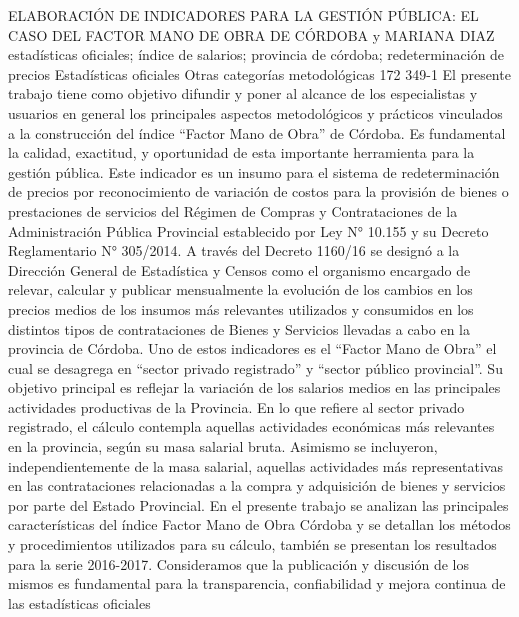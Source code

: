 \A
{ELABORACIÓN DE INDICADORES PARA LA GESTIÓN PÚBLICA: EL CASO DEL FACTOR MANO DE OBRA DE CÓRDOBA}
{ y MARIANA DIAZ}
{
\\}
{estadísticas oficiales; índice de salarios; provincia de córdoba; redeterminación de precios} 
 {Estadísticas oficiales} 
 {Otras categorías metodológicas} 
 {172} 
 {349-1}
{El presente trabajo tiene como objetivo difundir y poner al alcance de los especialistas y usuarios en general los principales aspectos metodológicos y prácticos vinculados a la construcción del índice “Factor Mano de Obra” de Córdoba. Es fundamental la calidad, exactitud, y oportunidad de esta importante herramienta para la gestión pública. Este indicador es un insumo para el sistema de redeterminación de precios por reconocimiento de variación de costos para la provisión de bienes o prestaciones de servicios del Régimen de Compras y Contrataciones de la Administración Pública Provincial establecido por Ley N° 10.155 y su Decreto Reglamentario N° 305/2014. A través del Decreto 1160/16 se designó a la Dirección General de Estadística y Censos como el organismo encargado de relevar, calcular y publicar mensualmente la evolución de los cambios en los precios medios de los insumos más relevantes utilizados y consumidos en los distintos tipos de contrataciones de Bienes y Servicios llevadas a cabo en la provincia de Córdoba. Uno de estos indicadores es el “Factor Mano de Obra” el cual se desagrega en “sector privado registrado” y “sector público provincial”. Su objetivo principal es reflejar la variación de los salarios medios en las principales actividades productivas de la Provincia. En lo que refiere al sector privado registrado, el cálculo contempla aquellas actividades económicas más relevantes en la provincia, según su masa salarial bruta. Asimismo se incluyeron, independientemente de la masa salarial, aquellas actividades más representativas en las contrataciones relacionadas a la compra y adquisición de bienes y servicios por parte del Estado Provincial. En el presente trabajo se analizan las principales características del índice Factor Mano de Obra Córdoba y se detallan los métodos y procedimientos utilizados para su cálculo, también se presentan los resultados para la serie 2016-2017. Consideramos que la publicación y discusión de los mismos es fundamental para la transparencia, confiabilidad y mejora continua de las estadísticas oficiales }
